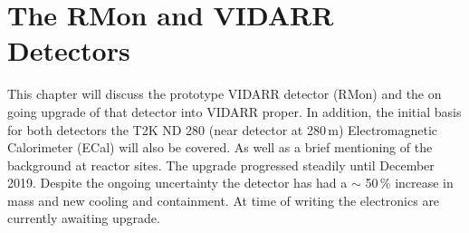 
\ifpdf
    \graphicspath{{Chapter3/Figs/Raster/}{Chapter3/Figs/PDF/}{Chapter3/Figs/}}
\else
    \graphicspath{{Chapter3/Figs/Vector/}{Chapter3/Figs/}}
\fi


\chapter{The RMon and VIDARR Detectors}\label{Chp:ThePrototypeDetector}
This chapter will discuss the prototype VIDARR detector (RMon) and the on going upgrade of that detector into VIDARR proper. In addition, the initial basis for both detectors the T2K ND 280 (near detector at 280\,m) Electromagnetic Calorimeter (ECal) will also be covered. As well as a brief mentioning of the background at reactor sites. The upgrade progressed steadily until December 2019. Despite the ongoing uncertainty the detector has had a $\sim$ 50\,\% increase in mass and new cooling and containment. At time of writing the electronics are currently awaiting upgrade. 

